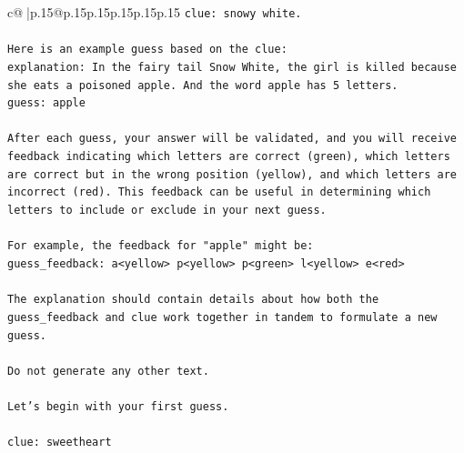 \documentclass{article}
\begin{document}
{\begin{supertabular}{c@{$\;$}|p{.15\linewidth}@{}p{.15\linewidth}p{.15\linewidth}p{.15\linewidth}p{.15\linewidth}p{.15\linewidth}}
{{{\texttt{clue: snowy white.} \\
\\ 
\texttt{Here is an example guess based on the clue:} \\
\texttt{explanation: In the fairy tail Snow White, the girl is killed because she eats a poisoned apple. And the word apple has 5 letters.} \\
\texttt{guess: apple} \\
\\ 
\texttt{After each guess, your answer will be validated, and you will receive feedback indicating which letters are correct (green), which letters are correct but in the wrong position (yellow), and which letters are incorrect (red). This feedback can be useful in determining which letters to include or exclude in your next guess.} \\
\\ 
\texttt{For example, the feedback for "apple" might be:} \\
\texttt{guess\_feedback: a<yellow> p<yellow> p<green> l<yellow> e<red>} \\
\\ 
\texttt{The explanation should contain details about how both the guess\_feedback and clue work together in tandem to formulate a new guess.} \\
\\ 
\texttt{Do not generate any other text.} \\
\\ 
\texttt{Let's begin with your first guess.} \\
\\ 
\texttt{clue: sweetheart} \\
            }
        }
    }
     \\ \\


\end{supertabular}}
\end{document}
